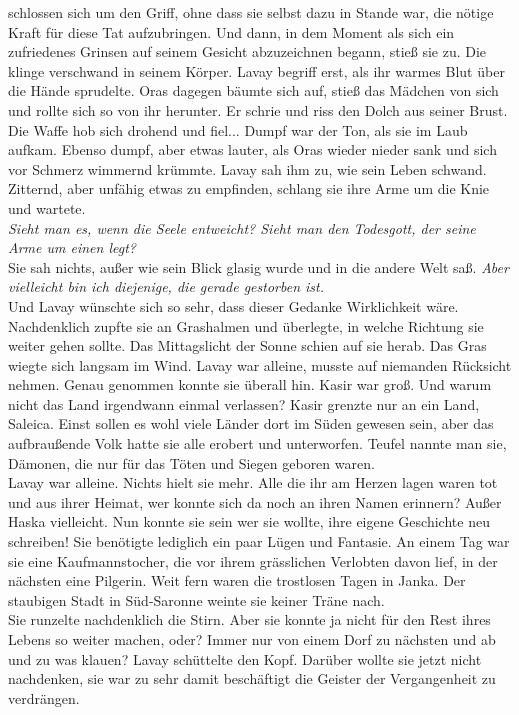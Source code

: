 schlossen sich um den Griff, ohne dass sie selbst dazu in Stande war, die nötige Kraft für diese 
Tat aufzubringen. Und dann, in dem Moment als sich ein zufriedenes Grinsen auf seinem Gesicht 
abzuzeichnen begann, stieß sie zu. Die klinge verschwand in seinem Körper. Lavay begriff erst, als 
ihr warmes Blut über die Hände sprudelte. Oras dagegen bäumte sich auf, stieß das Mädchen von sich 
und rollte sich so von ihr herunter. Er schrie und riss den Dolch aus seiner Brust. Die Waffe hob 
sich drohend und fiel... Dumpf war der Ton, als sie im Laub aufkam. Ebenso dumpf, aber etwas lauter, 
als Oras wieder nieder sank und sich vor Schmerz wimmernd krümmte. Lavay sah ihm zu, wie sein Leben 
schwand. Zitternd, aber unfähig etwas zu empfinden, schlang sie ihre Arme um die Knie und 
wartete.\\
\textit{Sieht man es, wenn die Seele entweicht? Sieht man den Todesgott, der seine Arme um einen 
legt?}\\
Sie sah nichts, außer wie sein Blick glasig wurde und in die andere Welt saß. \textit{Aber 
vielleicht bin ich diejenige, die gerade gestorben ist.}\\
Und Lavay wünschte sich so sehr, dass dieser Gedanke Wirklichkeit wäre.\\

Nachdenklich zupfte sie an Grashalmen und überlegte, in welche Richtung sie weiter gehen sollte. 
Das Mittagslicht der Sonne schien auf sie herab. Das Gras wiegte sich langsam im Wind. Lavay war 
alleine, musste auf niemanden Rücksicht nehmen. Genau genommen konnte sie überall hin. Kasir 
war groß. Und warum nicht das Land irgendwann einmal verlassen? Kasir grenzte nur an ein Land, 
Saleica. Einst sollen es wohl viele Länder dort im Süden gewesen sein, aber das aufbraußende 
Volk hatte sie alle erobert und unterworfen. Teufel nannte man sie, Dämonen, die nur für das 
Töten und Siegen geboren waren.\\
Lavay war alleine. Nichts hielt sie mehr. Alle die ihr am Herzen lagen waren tot und aus ihrer 
Heimat, wer konnte sich da noch an ihren Namen erinnern? Außer Haska vielleicht. Nun konnte sie 
sein wer sie wollte, ihre eigene Geschichte neu schreiben! Sie benötigte lediglich ein paar Lügen 
und Fantasie. An einem Tag war sie eine Kaufmannstocher, die vor ihrem grässlichen Verlobten davon 
lief, in der nächsten eine Pilgerin. Weit fern waren die trostlosen Tagen in Janka. Der staubigen 
Stadt in Süd-Saronne weinte sie keiner Träne nach.\\
Sie runzelte nachdenklich die Stirn. Aber sie konnte ja nicht für den Rest ihres Lebens so weiter 
machen, oder? Immer nur von einem Dorf zu nächsten und ab und zu was klauen? Lavay schüttelte den 
Kopf. Darüber wollte sie jetzt nicht nachdenken, sie war zu sehr damit beschäftigt die Geister der 
Vergangenheit zu verdrängen.\\

